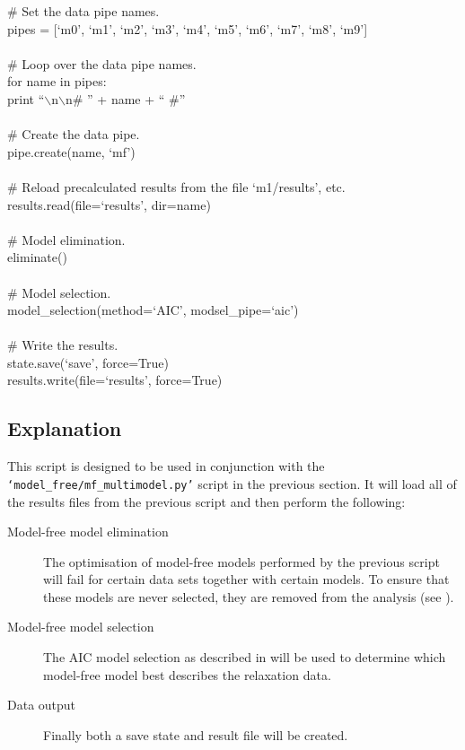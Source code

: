 \begin{htmlonly}
\begin{htmlonly}
\begin{exampleenv}
\# Set the data pipe names. \\
pipes = [`m0', `m1', `m2', `m3', `m4', `m5', `m6', `m7', `m8', `m9'] \\
 \\
\# Loop over the data pipe names. \\
for name in pipes: \\
\hspace*{4ex} print ``$\backslash$n$\backslash$n\# '' + name + `` \#'' \\
 \\
\hspace*{4ex} \# Create the data pipe. \\
\hspace*{4ex} pipe.create(name, `mf') \\
 \\
\hspace*{4ex} \# Reload precalculated results from the file `m1/results', etc. \\
\hspace*{4ex} results.read(file=`results', dir=name) \\
 \\
\# Model elimination. \\
eliminate() \\
 \\
\# Model selection. \\
model\_selection(method=`AIC', modsel\_pipe=`aic') \\
 \\
\# Write the results. \\
state.save(`save', force=True) \\
results.write(file=`results', force=True)
\end{exampleenv}



\subsection{Explanation}

This script is designed to be used in conjunction with the \texttt{`model\_free/mf\_multimodel.py'} script in the previous section.  It will load all of the results files from the previous script and then perform the following:

\begin{description}
\item[Model-free model elimination]  The optimisation of model-free models performed by the previous script will fail for certain data sets together with certain models.  To ensure that these models are never selected, they are removed from the analysis (see \citet{dAuvergneGooley06}).
\item[Model-free model selection]  The AIC model selection as described in \citet{dAuvergneGooley03} will be used to determine which model-free model best describes the relaxation data.
\item[Data output]  Finally both a save state and result file will be created.
\end{description}


\end{htmlonly}
\end{htmlonly}
